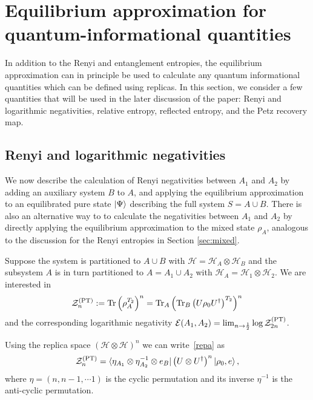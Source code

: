 \documentclass[a4paper,11pt]{article}
\newcommand\half{{\ensuremath{\frac{1}{2}}}}
\newcommand\da{{\dagger}}
\newcommand\ha{{\half}}
\newcommand\sH{{\ensuremath{{\mathcal H}}}}
\newcommand{\Tr}{\text{Tr}}
\begin{document}
\section{Equilibrium approximation for quantum-informational quantities} 
\label{eq_approx_sec}


In addition to the Renyi and entanglement entropies, the equilibrium approximation can in principle be used to calculate any quantum informational quantities which can be defined using replicas. In this section, we consider a few quantities that will be used in the later discussion of the paper: Renyi and logarithmic negativities, relative entropy, reflected entropy, and the Petz recovery map. 

\subsection{Renyi and logarithmic negativities} \label{sec:negas}


We now describe the calculation of Renyi negativities between $A_1$ and $A_2$ by adding an auxiliary system $B$ to $A$, and applying the equilibrium approximation to an equilibrated pure state $\ket{\Psi}$ describing the full system $S = A \cup B$. 
There is also an alternative way to to calculate the negativities between $A_1$ and $A_2$ by directly applying the equilibrium approximation to the mixed state $\rho_A$, analogous to the discussion for the Renyi entropies in Section \ref{sec:mixed}.





Suppose the system is partitioned to $A \cup B$ with $\sH = \sH_A \otimes \sH_B$ and 
the subsystem $A$ is in turn partitioned to $A = A_1 \cup A_2$ with $\sH_A = \sH_1 \otimes \sH_2$. 
We are interested in
\begin{align}\label{repa}
 \mathcal{Z}_n^{(\rm PT)} := \Tr \left( \rho_{A}^{T_2} \right)^n = \Tr_{A} \left( \Tr_{B}\left( U\rho_0U^{\dagger}\right)^{T_2}\right)^n
\end{align}
and the corresponding logarithmic negativity $\mathcal{E}(A_1, A_2) = \lim_{n \to \ha} \log \mathcal{Z}_{2n}^{(\rm PT)}$. 

Using the replica space $(\sH \otimes \sH)^n$ we can write~\eqref{repa} as 
\begin{align} \label{repa1}
 \mathcal{Z}_n^{(\rm PT)} =\bra{\eta_{A_1} \otimes \eta^{-1}_{A_2} \otimes e_{B}}\left( U\otimes U^\da \right)^n\ket{\rho_0, e},
\end{align}
where $\eta = (n, n-1, \cdots 1)$ is the cyclic permutation and its inverse $\eta^{-1}$ is the anti-cyclic permutation. 
\end{document}
